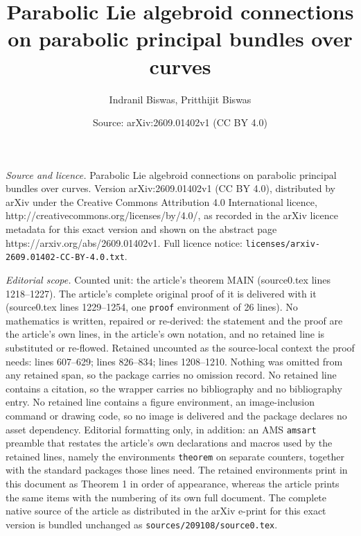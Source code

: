 \documentclass[10pt,a4paper]{amsart}
\title{Parabolic Lie algebroid connections on parabolic principal bundles over curves}
\author{Indranil Biswas, Pritthijit Biswas}
\date{Source: arXiv:2609.01402v1 (CC BY 4.0)}
\begin{document}
\maketitle

\noindent\emph{Source and licence.} Parabolic Lie algebroid connections on parabolic principal bundles over curves. Version arXiv:2609.01402v1 (CC BY 4.0), distributed by arXiv under the Creative Commons Attribution 4.0 International licence, http://creativecommons.org/licenses/by/4.0/, as recorded in the arXiv licence metadata for this exact version and shown on the abstract page https://arxiv.org/abs/2609.01402v1. Full licence notice: \texttt{licenses/arxiv-2609.01402-CC-BY-4.0.txt}.\par\smallskip

\noindent\textit{Editorial scope.} Counted unit: the article's theorem MAIN (source0.tex lines 1218--1227). The article's complete original proof of it is delivered with it (source0.tex lines 1229--1254, one \texttt{proof} environment of 26 lines). No mathematics is written, repaired or re-derived: the statement and the proof are the article's own lines, in the article's own notation, and no retained line is substituted or re-flowed.  Retained uncounted as the source-local context the proof needs: lines 607--629; lines 826--834; lines 1208--1210.  Nothing was omitted from any retained span, so the package carries no omission record.  No retained line contains a citation, so the wrapper carries no bibliography and no bibliography entry.  No retained line contains a figure environment, an image-inclusion command or drawing code, so no image is delivered and the package declares no asset dependency.  Editorial formatting only, in addition: an AMS \texttt{amsart} preamble that restates the article's own declarations and macros used by the retained lines, namely the environments \texttt{theorem} on separate counters, together with the standard packages those lines need.  The retained environments print in this document as Theorem 1 in order of appearance, whereas the article prints the same items with the numbering of its own full document.  The complete native source of the article as distributed in the arXiv e-print for this exact version is bundled unchanged as \texttt{sources/209108/source0.tex}.
\end{document}
